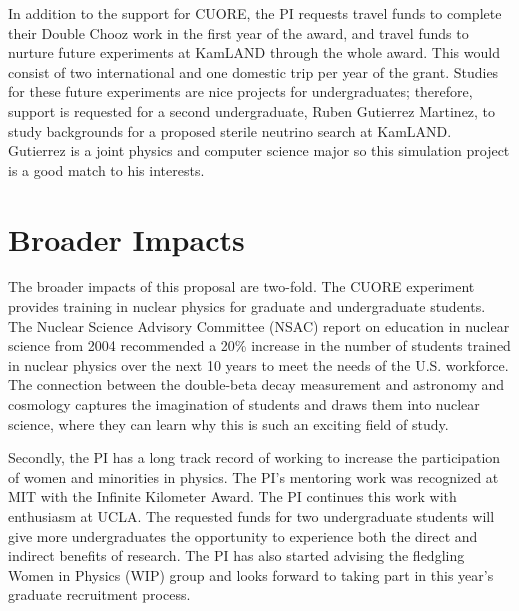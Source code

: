 In addition to the support for CUORE, the PI requests travel funds to complete their Double Chooz work in the first year of the award, and travel funds to nurture future experiments at KamLAND through the whole award. This would consist of two international and one domestic trip per year of the grant. Studies for these future experiments are nice projects for undergraduates; therefore, support is requested for a second undergraduate, Ruben Gutierrez Martinez, to study backgrounds for a proposed sterile neutrino search at KamLAND\cite{isodar}. Gutierrez is a joint physics and computer science major so this simulation project is a good match to his interests.

\section{Broader Impacts}
The broader impacts of this proposal are two-fold. The CUORE experiment provides training in nuclear physics for graduate and undergraduate students. The Nuclear Science Advisory Committee (NSAC) report on education in nuclear science from 2004 recommended a 20\% increase in the number of students trained in nuclear physics over the next 10 years to meet the needs of the U.S. workforce\cite{nuced}. The connection between the double-beta decay measurement and astronomy and cosmology captures the imagination of students and draws them into nuclear science, where they can learn why this is such an exciting field of study.

Secondly, the PI has a long track record of working to increase the participation of women
and minorities in physics. The PI's mentoring work was recognized at MIT with the Infinite Kilometer Award. The PI continues this work with enthusiasm at UCLA. The requested funds for two undergraduate students will give more undergraduates the opportunity to experience both the direct and indirect benefits of research. The PI has also started advising the fledgling Women in Physics (WIP) group and looks forward to taking part in this year's graduate recruitment process.


